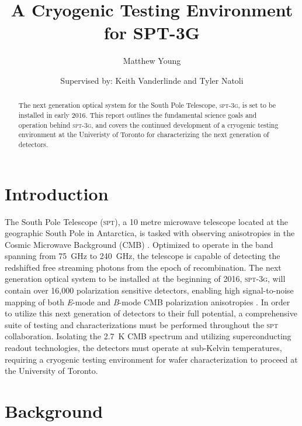\documentclass[preprint]{aastex}
\begin{document}
\title{A Cryogenic Testing Environment for SPT-3G}
\author{Matthew Young}
\author{Supervised by: Keith Vanderlinde and Tyler Natoli}

\begin{abstract}
The next generation optical system for the South Pole Telescope, \textsc{spt-3g}, is set to be installed in early 2016.  This report outlines the fundamental science goals and operation behind \textsc{spt-3g}, and covers the continued development of a cryogenic testing environment at the Univeristy of Toronto for characterizing the next generation of detectors.  
\end{abstract}



\section{Introduction}

The South Pole Telescope (\textsc{spt}), a 10 metre microwave telescope located at the geographic South Pole in Antarctica, is tasked with observing anisotropies in the Cosmic Microwave Background (CMB) \citep{spt_collaboration_south_2004}.  Optimized to operate in the band spanning from 75~GHz to 240~GHz, the telescope is capable of detecting the redshifted free streaming photons from the epoch of recombination.  The next generation optical system to be installed at the beginning of 2016, \textsc{spt-3g}, will contain over 16,000 polarization sensitive detectors, enabling high signal-to-noise mapping of both \textit{E}-mode and \textit{B}-mode CMB polarization anisotropies \citep{benson_spt-3g:_2014}.  In order to utilize this next generation of detectors to their full potential, a comprehensive suite of testing and characterizations must be performed throughout the \textsc{spt} collaboration.  Isolating the 2.7~K CMB spectrum and utilizing superconducting readout technologies, the detectors must operate at sub-Kelvin temperatures, requiring a cryogenic testing environment for wafer characterization to proceed at the University of Toronto.

\section{Background}
\end{document}
